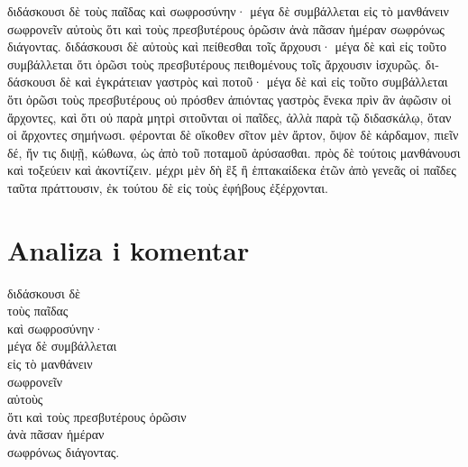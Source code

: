 \medskip


{\large

\begin{greek}

\noindent  διδάσκουσι δὲ τοὺς παῖδας καὶ σωφροσύνην· μέγα δὲ συμβάλλεται εἰς τὸ μανθάνειν σωφρονεῖν αὐτοὺς ὅτι καὶ τοὺς πρεσβυτέρους ὁρῶσιν ἀνὰ πᾶσαν ἡμέραν σωφρόνως διάγοντας. διδάσκουσι δὲ αὐτοὺς καὶ πείθεσθαι τοῖς ἄρχουσι· μέγα δὲ καὶ εἰς τοῦτο συμβάλλεται ὅτι ὁρῶσι τοὺς πρεσβυτέρους πειθομένους τοῖς ἄρχουσιν ἰσχυρῶς. διδάσκουσι δὲ καὶ ἐγκράτειαν γαστρὸς καὶ ποτοῦ· μέγα δὲ καὶ εἰς τοῦτο συμβάλλεται ὅτι ὁρῶσι τοὺς πρεσβυτέρους οὐ πρόσθεν ἀπιόντας γαστρὸς ἕνεκα πρὶν ἂν ἀφῶσιν οἱ ἄρχοντες, καὶ ὅτι οὐ παρὰ μητρὶ σιτοῦνται οἱ παῖδες, ἀλλὰ παρὰ τῷ διδασκάλῳ, ὅταν οἱ ἄρχοντες σημήνωσι. φέρονται δὲ οἴκοθεν σῖτον μὲν ἄρτον, ὄψον δὲ κάρδαμον, πιεῖν δέ, ἤν τις διψῇ, κώθωνα, ὡς ἀπὸ τοῦ ποταμοῦ ἀρύσασθαι. πρὸς δὲ τούτοις μανθάνουσι καὶ τοξεύειν καὶ ἀκοντίζειν. μέχρι μὲν δὴ ἓξ ἢ ἑπτακαίδεκα ἐτῶν ἀπὸ γενεᾶς οἱ παῖδες ταῦτα πράττουσιν, ἐκ τούτου δὲ εἰς τοὺς ἐφήβους ἐξέρχονται.

\end{greek}

}


\section*{Analiza i komentar}



{\large
\begin{greek}
\noindent  διδάσκουσι δὲ \\
τοὺς παῖδας \\
καὶ σωφροσύνην· \\
μέγα δὲ συμβάλλεται \\
\tabto{2em} εἰς τὸ μανθάνειν \\
\tabto{4em} σωφρονεῖν \\
\tabto{2em} αὐτοὺς \\
ὅτι καὶ τοὺς πρεσβυτέρους ὁρῶσιν \\
\tabto{4em} ἀνὰ πᾶσαν ἡμέραν \\
\tabto{2em} σωφρόνως διάγοντας. \\

\end{greek}
}

